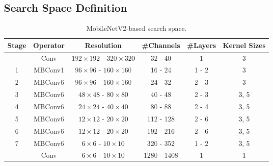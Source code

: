 \documentclass[runningheads]{llncs}
\begin{document}
\subsection{Search Space Definition}
\begin{table}[ht]
\small
\centering
\caption{MobileNetV2-based search space.}
\begin{tabular}{@{}c c c c c c@{}} \toprule
Stage & Operator & Resolution & \#Channels & \#Layers & Kernel Sizes\\
\midrule
 & Conv & \(192\times192\) - \(320\times320\) & 32 - 40 & 1 & 3\\
\cmidrule{1-6}
 1 & MBConv1 & \(96\times96\) - \(160\times160\) & 16 - 24 & 1 - 2 & 3\\
 \cmidrule{1-6}
 2 & MBConv6 & \(96\times96\) - \(160\times160\) & 24 - 32 & 2 - 3 & 3\\
 \cmidrule{1-6}
 3 & MBConv6 & \(48\times48\) - \(80\times80\) & 40 - 48 & 2 - 3 & 3, 5\\
 \cmidrule{1-6}
 4 & MBConv6 & \(24\times24\) - \(40\times40\) & 80 - 88 & 2 - 4 & 3, 5\\
 \cmidrule{1-6}
 5 & MBConv6 & \(12\times12\) - \(20\times20\) & 112 - 128 & 2 - 6 & 3, 5\\
 \cmidrule{1-6}
 6 & MBConv6 & \(12\times12\) - \(20\times20\) & 192 - 216 & 2 - 6 & 3, 5\\
 \cmidrule{1-6}
 7 & MBConv6 & \(6\times6\) - \(10\times10\) & 320 - 352 & 1 - 2 & 3, 5\\
 \cmidrule{1-6}
  &  Conv & \(6\times6\) - \(10\times10\) & 1280 - 1408 & 1 & 1 \\
\bottomrule
\end{tabular}
\label{tabs:search_space}
\end{table} 
\end{document}
